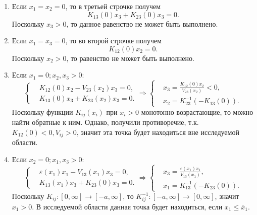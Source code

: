 \begin{enumerate}
\begin{enumerate}
            
        \end{enumerate}


        \item Если \( x_1 = x_2 = 0 \), то в третьей строчке получем
        \[ K_{13}(0)x_3 + K_{23}(0)x_3 = 0. \]
        Поскольку \( x_3 > 0\), то данное равенство не может быть выполнено.


        \item Если \( x_1 = x_3 = 0 \), то во второй строчке получем
        \[ K_{12}(0)x_2 = 0. \]
        Поскольку \( x_2 > 0 \), то равенство не может быть выполнено.


        \item Если \( x_1 = 0; x_2, x_3 > 0 \):
            \[
                \left\{\begin{split}
                    & K_{12}(0)x_2 - V_{23}(x_2)x_3 = 0, \\
                    & K_{13}(0)x_3 + K_{23}(x_2)x_3 = 0. 
                \end{split}\right.
                \Rightarrow
                \left\{\begin{split}
                    & x_3 = \frac{ K_{12}(0)x_2 }{ V_{23}(x_2) } < 0, \\
                    & x_2 =K^{-1}_{23} ( -K_{13}(0) ). 
                \end{split}\right.
            \]
            Поскольку функции \( K_{ij} (x_i) \) при \( x_i > 0 \) монотонно возрастающие, то можно найти обратные к ним. Однако, получили противоречие, т.к. \( K_{12}(0) < 0, V_{ij} > 0\), значит эта точка будет находиться вне исследуемой области.
        \item Если \( x_2 = 0; x_1, x_3 > 0 \):
            \[
                \left\{\begin{split}
                    & \varepsilon(x_1)x_1 - V_{13}(x_1)x_3 = 0, \\
                    & K_{13}(x_1)x_3 + K_{23}(0)x_3 = 0. 
                \end{split}\right.
                \Rightarrow
                \left\{\begin{split}
                    & x_3 = \frac{ \varepsilon(x_1)x_1 }{ V_{13}(x_1) }, \\
                    & x_1 = K^{-1}_{13} \left( - K_{23}(0) \right). 
                \end{split}\right.
            \]
            Поскольку \( K_{ij}: [0, \infty] \rightarrow [-a, \infty] \), то  \( K^{-1}_{ij}: [-a, \infty] \rightarrow [0, \infty] \), значит \( x_1 > 0 \). В исследуемой области данная точка будет находиться, если \( x_1 \leq \bar{x}_1 \).

\end{enumerate}
